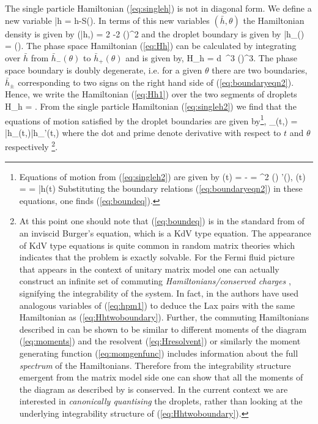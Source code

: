 \documentclass[final,3p,12pt,times]{elsarticle}
\numberwithin{equation}{section}
\begin{document}
The single particle Hamiltonian (\ref{eq:singleh}) is not in diagonal form. We define a new variable
%
\ben
\bar h = h-S(\theta).
\een
%
In terms of this new variables $(\bar h, \theta)$ the Hamiltonian density is given by
%
\ben\label{eq:singleh2}
(\bar h,\theta) = 2 -2 \rho(\theta)^2
\een
%
and the droplet boundary is given by
%
\ben\label{eq:boundaryeqn2}
\bar h_{\pm}(\theta) = \pm \pi \rho(\theta).
\een
%
The phase space Hamiltonian (\ref{eq:Hh}) can be calculated by integrating over $\bar h$ from $\bar h_{-}(\theta)$ to $\bar h_{+}(\theta)$ and is given by,
%
\ben\label{eq:Hh1}
H_h = \int d\theta \ \pi^3 \rho(\theta)^3.
\een
%
The phase space boundary is doubly degenerate, i.e. for a given $\theta$ there are two boundaries, $\bar h_{\pm}$ corresponding to two signs on the right hand side of (\ref{eq:boundaryeqn2}). Hence, we write the Hamiltonian (\ref{eq:Hh1}) over the two segments of droplets \cite{Maoz:2005nk}
%
\ben\label{eq:Hhtwoboundary}
H_h = .
\een
%
From the single particle Hamiltonian (\ref{eq:singleh2}) we find that the equations of motion satisfied by the droplet boundaries are given by\footnote{Equations of motion from (\ref{eq:singleh2}) are given by %
\ben\label{eq:eom}
(t) = - = \pi^2 \rho(\theta) \rho'(\theta), \qquad \dot \theta(t) =  = \bar h(t)
\een
%
Substituting the boundary relations (\ref{eq:boundaryeqn2}) in these equations, one finds (\ref{eq:boundeq}).},
%
\ben\label{eq:boundeq}
_{\pm}(t,\theta) = \bar h_\pm(t,\theta)\bar h_\pm'(t,\theta)
\een
%
{where the dot and prime denote derivative with respect to $t$ and $\theta$ respectively} \footnote{{At this point one should note that (\ref{eq:boundeq}) is in the standard from of an inviscid Burger's equation, which is a KdV type equation. The appearance of KdV type equations is quite common in random matrix theories which indicates that the problem is exactly solvable. For the Fermi fluid picture that appears in the context of unitary matrix model one can actually construct an infinite set of commuting \emph{Hamiltonians/conserved charges} \cite{Avan:1991kq,Avan:1991ik}, signifying the integrability of the system. In fact, in \cite{Avan:1991ik} the authors have used analogous variables of (\ref{eq:hpm1}) to deduce the Lax pairs with the same Hamiltonian as (\ref{eq:Hhtwoboundary}). Further, the commuting Hamiltonians described in \cite{Avan:1991ik,Jevicki:1993qn} can be shown to be similar to different moments of the diagram (\ref{eq:moments}) and the resolvent (\ref{eq:Hresolvent}) or similarly the moment generating function (\ref{eq:momgenfunc}) includes information about the full \emph{spectrum} of the Hamiltonians. Therefore from the integrability structure emergent from the matrix model side one can show that all the moments of the diagram as described by \cite{Kerov1} is conserved. In the current context we are interested in \emph{canonically quantising} the droplets, rather than looking at the underlying integrability structure of (\ref{eq:Hhtwoboundary}).}}.
\end{document}
